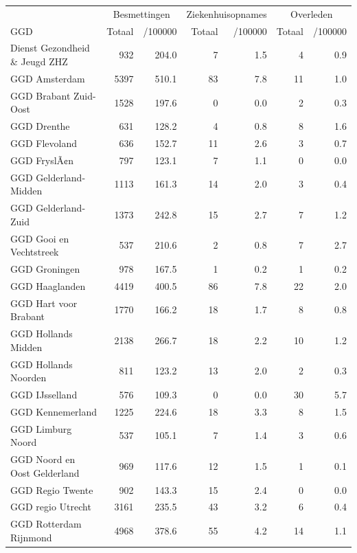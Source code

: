 \documentclass[
  english,
  man,floatsintext]{apa6}
\begin{document}
\begin{table}[H]
\centering\begingroup\fontsize{10}{12}\selectfont

\begin{threeparttable}
\begin{tabular}{lrrrrrr}
\toprule
\multicolumn{1}{c}{ } & \multicolumn{2}{c}{Besmettingen} & \multicolumn{2}{c}{Ziekenhuisopnames} & \multicolumn{2}{c}{Overleden} \\
\cmidrule(l{3pt}r{3pt}){2-3} \cmidrule(l{3pt}r{3pt}){4-5} \cmidrule(l{3pt}r{3pt}){6-7}
GGD & Totaal & /100000 & Totaal & /100000 & Totaal & /100000\\
\midrule
Dienst Gezondheid \& Jeugd ZHZ & 932 & 204.0 & 7 & 1.5 & 4 & 0.9\\
GGD Amsterdam & 5397 & 510.1 & 83 & 7.8 & 11 & 1.0\\
GGD Brabant Zuid-Oost & 1528 & 197.6 & 0 & 0.0 & 2 & 0.3\\
GGD Drenthe & 631 & 128.2 & 4 & 0.8 & 8 & 1.6\\
GGD Flevoland & 636 & 152.7 & 11 & 2.6 & 3 & 0.7\\
GGD FryslÃ¢n & 797 & 123.1 & 7 & 1.1 & 0 & 0.0\\
GGD Gelderland-Midden & 1113 & 161.3 & 14 & 2.0 & 3 & 0.4\\
GGD Gelderland-Zuid & 1373 & 242.8 & 15 & 2.7 & 7 & 1.2\\
GGD Gooi en Vechtstreek & 537 & 210.6 & 2 & 0.8 & 7 & 2.7\\
GGD Groningen & 978 & 167.5 & 1 & 0.2 & 1 & 0.2\\
GGD Haaglanden & 4419 & 400.5 & 86 & 7.8 & 22 & 2.0\\
GGD Hart voor Brabant & 1770 & 166.2 & 18 & 1.7 & 8 & 0.8\\
GGD Hollands Midden & 2138 & 266.7 & 18 & 2.2 & 10 & 1.2\\
GGD Hollands Noorden & 811 & 123.2 & 13 & 2.0 & 2 & 0.3\\
GGD IJsselland & 576 & 109.3 & 0 & 0.0 & 30 & 5.7\\
GGD Kennemerland & 1225 & 224.6 & 18 & 3.3 & 8 & 1.5\\
GGD Limburg Noord & 537 & 105.1 & 7 & 1.4 & 3 & 0.6\\
GGD Noord en Oost Gelderland & 969 & 117.6 & 12 & 1.5 & 1 & 0.1\\
GGD Regio Twente & 902 & 143.3 & 15 & 2.4 & 0 & 0.0\\
GGD regio Utrecht & 3161 & 235.5 & 43 & 3.2 & 6 & 0.4\\
GGD Rotterdam Rijnmond & 4968 & 378.6 & 55 & 4.2 & 14 & 1.1\\

\end{tabular}
\end{threeparttable}
\end{table}
\end{document}
